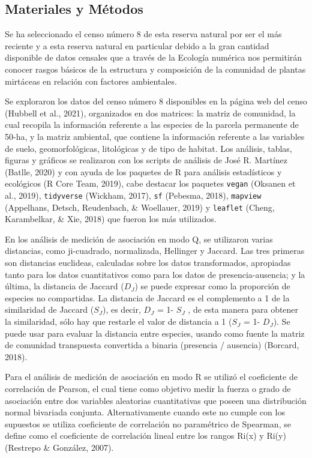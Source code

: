 \documentclass[11pt,]{article}
\begin{document}
\subsection{Materiales y Métodos}\label{materiales-y-muxe9todos}

Se ha seleccionado el censo número 8 de esta reserva natural por ser el
más reciente y a esta reserva natural en particular debido a la gran
cantidad disponible de datos censales que a través de la Ecología
numérica nos permitirán conocer rasgos básicos de la estructura y
composición de la comunidad de plantas mirtáceas en relación con
factores ambientales.

Se exploraron los datos del censo número 8 disponibles en la página web
del censo (Hubbell et al., 2021), organizados en dos matrices: la matriz
de comunidad, la cual recopila la información referente a las especies
de la parcela permanente de 50-ha, y la matriz ambiental, que contiene
la información referente a las variables de suelo, geomorfológicas,
litológicas y de tipo de habitat. Los análisis, tablas, figuras y
gráficos se realizaron con los scripts de análisis de José R. Martínez
(Batlle, 2020) y con ayuda de los paquetes de R para análisis
estadísticos y ecológicos (R Core Team, 2019), cabe destacar los
paquetes \texttt{vegan} (Oksanen et al., 2019), \texttt{tidyverse}
(Wickham, 2017), \texttt{sf} (Pebesma, 2018), \texttt{mapview}
(Appelhans, Detsch, Reudenbach, \& Woellauer, 2019) y \texttt{leaflet}
(Cheng, Karambelkar, \& Xie, 2018) que fueron los más utilizados.

En los análisis de medición de asociación en modo Q, se utilizaron
varias distancias, como ji-cuadrado, normalizada, Hellinger y Jaccard.
Las tres primeras son distancias euclideas, calculadas sobre los datos
transformados, apropiadas tanto para los datos cuantitativos como para
los datos de presencia-ausencia; y la última, la distancia de Jaccard
(\(D_J\)) se puede expresar como la proporción de especies no
compartidas. La distancia de Jaccard es el complemento a 1 de la
similaridad de Jaccard (\(S_J\)), es decir, \(D_J\) = 1- \(S_J\) , de
esta manera para obtener la similaridad, sólo hay que restarle el valor
de distancia a 1 (\(S_J\) = 1- \(D_J\)). Se puede usar para evaluar la
distancia entre especies, usando como fuente la matriz de comunidad
transpuesta convertida a binaria (presencia / ausencia) (Borcard, 2018).

Para el análisis de medición de asociación en modo R se utilizó el
coeficiente de correlación de Pearson, el cual tiene como objetivo medir
la fuerza o grado de asociación entre dos variables aleatorias
cuantitativas que poseen una distribución normal bivariada conjunta.
Alternativamente cuando este no cumple con los supuestos se utiliza
coeficiente de correlación no paramétrico de Spearman, se define como el
coeficiente de correlación lineal entre los rangos Ri(x) y Ri(y)
(Restrepo \& González, 2007).
\end{document}
